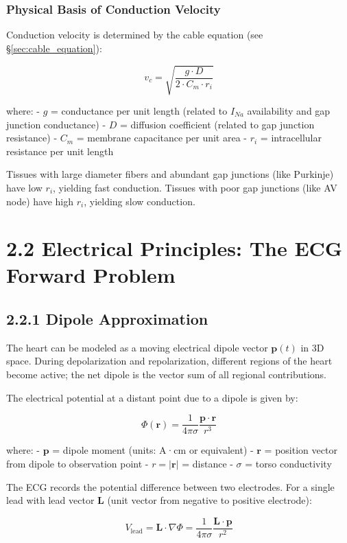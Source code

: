 \documentclass[12pt,oneside,a4paper]{book}
\begin{document}
\subsubsection{Physical Basis of Conduction Velocity}

Conduction velocity is determined by the cable equation (see \S\ref{sec:cable_equation}):

$$v_c = \sqrt{\frac{g \cdot D}{2 \cdot C_m \cdot r_i}}$$

where:
- $g$ = conductance per unit length (related to $I_{Na}$ availability and gap junction conductance)
- $D$ = diffusion coefficient (related to gap junction resistance)
- $C_m$ = membrane capacitance per unit area
- $r_i$ = intracellular resistance per unit length

Tissues with large diameter fibers and abundant gap junctions (like Purkinje) have low $r_i$, yielding fast conduction. Tissues with poor gap junctions (like AV node) have high $r_i$, yielding slow conduction.

\section{2.2 Electrical Principles: The ECG Forward Problem}

\subsection{2.2.1 Dipole Approximation}

The heart can be modeled as a moving electrical dipole vector $\mathbf{p}(t)$ in 3D space. During depolarization and repolarization, different regions of the heart become active; the net dipole is the vector sum of all regional contributions.

The electrical potential at a distant point due to a dipole is given by:

$$\Phi(\mathbf{r}) = \frac{1}{4\pi\sigma} \frac{\mathbf{p} \cdot \mathbf{r}}{r^3}$$

where:
- $\mathbf{p}$ = dipole moment (units: \textmu A·cm or equivalent)
- $\mathbf{r}$ = position vector from dipole to observation point
- $r = |\mathbf{r}|$ = distance
- $\sigma$ = torso conductivity

The ECG records the potential difference between two electrodes. For a single lead with lead vector $\mathbf{L}$ (unit vector from negative to positive electrode):

$$V_{\text{lead}} = \mathbf{L} \cdot \nabla\Phi = \frac{1}{4\pi\sigma} \frac{\mathbf{L} \cdot \mathbf{p}}{r^2}$$
\end{document}

